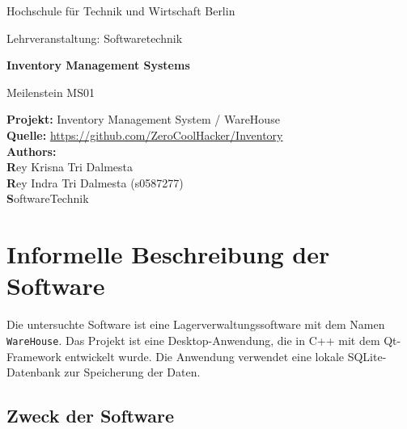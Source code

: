 \documentclass[12pt,a4paper]{article}
\begin{document}
	
	\begin{titlepage}
		\centering
		
		{\Large Hochschule für Technik und Wirtschaft Berlin\par}
		\vspace{1cm}
		
		{\Large Lehrveranstaltung: Softwaretechnik\par}
		\vspace{2cm}
		
		{\Huge\bfseries Inventory Management Systems\par}
		\vspace{0.5cm}
		
		{\Large Meilenstein MS01\par}
		\vspace{2cm}
		
		\begin{flushleft}
			\textbf{Projekt:} Inventory Management System / WareHouse \\[0.3cm]
			\textbf{Quelle:} \url{https://github.com/ZeroCoolHacker/Inventory} \\[0.3cm]
			\textbf {Authors:}\\ [0.3cm]
			\textbf Rey Krisna Tri Dalmesta \\[0.3cm]
			\textbf Rey Indra Tri Dalmesta (s0587277) \\[0.3cm]
			\textbf SoftwareTechnik \\[0.3cm]
		\end{flushleft}
		
		\vfill
		
	\end{titlepage}
	
	\tableofcontents
	\newpage
	
	\section{Informelle Beschreibung der Software}
	
	Die untersuchte Software ist eine Lagerverwaltungssoftware mit dem Namen
	\texttt{WareHouse}. Das Projekt ist eine Desktop-Anwendung, die in C++ mit dem
	Qt-Framework entwickelt wurde. Die Anwendung verwendet eine lokale
	SQLite-Datenbank zur Speicherung der Daten.
	
	\subsection{Zweck der Software}
	
\end{document}
